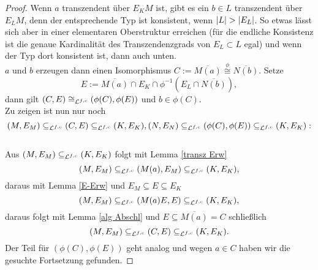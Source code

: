 \begin{proof}
    	Wenn $a$ transzendent über $E_KM$ ist, gibt es ein $b\in L$ transzendent über $E_LM$, denn der entsprechende Typ ist konsistent, wenn ${\left| L \right|}>{\left| E_L \right|}$. So etwas lässt sich aber in einer elementaren Oberstruktur erreichen (für die endliche Konsistenz ist die genaue Kardinalität des Transzendenzgrads von $E_L\subset L$ egal) und wenn der Typ dort konsistent ist, dann auch unten.\\
    	$a$ und $b$ erzeugen dann einen Isomorphismus $C:=\overline{M(a)}\overset{\phi}{\cong}\overline{N(b)}$. Setze $$E:=\overline{M(a)}\cap E_K\cap\phi^{-1}(E_L\cap\overline{N(b)}),$$ dann gilt $(C,E)\cong_{\mathcal{L}^{f,c}}(\phi(C),\phi(E))$ und $b\in\phi(C)$.\\
    	Zu zeigen ist nun nur noch $$(M,E_M)\subseteq_{\mathcal{L}^{f,c}}(C,E)\subseteq_{\mathcal{L}^{f,c}}(K,E_K),(N,E_N)\subseteq_{\mathcal{L}^{f,c}}(\phi(C),\phi(E))\subseteq_{\mathcal{L}^{f,c}}(K,E_K):$$\\
    	Aus $(M,E_M)\subseteq_{\mathcal{L}^{f,c}}(K,E_K)$ folgt mit Lemma \ref{transz Erw} $$(M,E_M)\subseteq_{\mathcal{L}^{f,c}}(M(a),E_M)\subseteq_{\mathcal{L}^{f,c}}(K,E_K),$$ daraus mit Lemma \ref{E-Erw} und $E_M\subseteq E\subseteq E_K$ $$(M,E_M)\subseteq_{\mathcal{L}^{f,c}}(M(a)E,E)\subseteq_{\mathcal{L}^{f,c}}(K,E_K),$$ daraus folgt mit Lemma \ref{alg Abschl} und $E\subseteq\overline{M(a)}=C$ schließlich $$(M,E_M)\subseteq_{\mathcal{L}^{f,c}}(C,E)\subseteq_{\mathcal{L}^{f,c}}(K,E_K).$$
    	Der Teil für $(\phi(C),\phi(E))$ geht analog und wegen $a\in C$ haben wir die gesuchte Fortsetzung gefunden.
    \end{proof}
    
    \newpage
    
